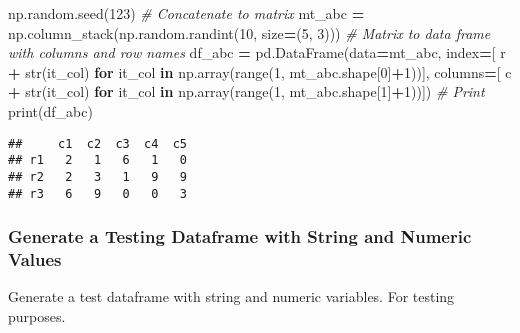 \documentclass[
]{book}
\newenvironment{Shaded}{\begin{snugshade}}{\end{snugshade}}
\newcommand{\BuiltInTok}[1]{#1}
\newcommand{\CommentTok}[1]{\textcolor[rgb]{0.56,0.35,0.01}{\textit{#1}}}
\newcommand{\ControlFlowTok}[1]{\textcolor[rgb]{0.13,0.29,0.53}{\textbf{#1}}}
\newcommand{\DecValTok}[1]{\textcolor[rgb]{0.00,0.00,0.81}{#1}}
\newcommand{\KeywordTok}[1]{\textcolor[rgb]{0.13,0.29,0.53}{\textbf{#1}}}
\newcommand{\NormalTok}[1]{#1}
\newcommand{\OperatorTok}[1]{\textcolor[rgb]{0.81,0.36,0.00}{\textbf{#1}}}
\newcommand{\StringTok}[1]{\textcolor[rgb]{0.31,0.60,0.02}{#1}}
\begin{document}
\begin{Shaded}
\begin{Highlighting}[]
\NormalTok{np.random.seed(}\DecValTok{123}\NormalTok{)}
\CommentTok{\# Concatenate to matrix}
\NormalTok{mt\_abc }\OperatorTok{=}\NormalTok{ np.column\_stack(np.random.randint(}\DecValTok{10}\NormalTok{, size}\OperatorTok{=}\NormalTok{(}\DecValTok{5}\NormalTok{, }\DecValTok{3}\NormalTok{)))}
\CommentTok{\# Matrix to data frame with columns and row names}
\NormalTok{df\_abc }\OperatorTok{=}\NormalTok{ pd.DataFrame(data}\OperatorTok{=}\NormalTok{mt\_abc,}
\NormalTok{            index}\OperatorTok{=}\NormalTok{[ }\StringTok{\textquotesingle{}r\textquotesingle{}} \OperatorTok{+} \BuiltInTok{str}\NormalTok{(it\_col) }\ControlFlowTok{for}\NormalTok{ it\_col }\KeywordTok{in}\NormalTok{ np.array(}\BuiltInTok{range}\NormalTok{(}\DecValTok{1}\NormalTok{, mt\_abc.shape[}\DecValTok{0}\NormalTok{]}\OperatorTok{+}\DecValTok{1}\NormalTok{))],}
\NormalTok{            columns}\OperatorTok{=}\NormalTok{[ }\StringTok{\textquotesingle{}c\textquotesingle{}} \OperatorTok{+} \BuiltInTok{str}\NormalTok{(it\_col) }\ControlFlowTok{for}\NormalTok{ it\_col }\KeywordTok{in}\NormalTok{ np.array(}\BuiltInTok{range}\NormalTok{(}\DecValTok{1}\NormalTok{, mt\_abc.shape[}\DecValTok{1}\NormalTok{]}\OperatorTok{+}\DecValTok{1}\NormalTok{))])}
\CommentTok{\# Print}
\BuiltInTok{print}\NormalTok{(df\_abc)}
\end{Highlighting}
\end{Shaded}

\begin{verbatim}
##     c1  c2  c3  c4  c5
## r1   2   1   6   1   0
## r2   2   3   1   9   9
## r3   6   9   0   0   3
\end{verbatim}

\hypertarget{generate-a-testing-dataframe-with-string-and-numeric-values}{%
\subsubsection{Generate a Testing Dataframe with String and Numeric Values}\label{generate-a-testing-dataframe-with-string-and-numeric-values}}

Generate a test dataframe with string and numeric variables. For testing purposes.
\end{document}
